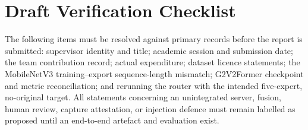 \documentclass[12pt,a4paper,oneside]{report}
\begin{document}




\tableofcontents
\listoffigures
\listoftables

\clearpage
{}








\clearpage



\appendix
\chapter{Draft Verification Checklist}
\label{app:checklist}
The following items must be resolved against primary records before the report is
submitted: supervisor identity and title; academic session and submission date;
the team contribution record; actual expenditure; dataset licence statements;
the MobileNetV3 training--export sequence-length mismatch; G2V2Former checkpoint
and metric reconciliation; and rerunning the router with the intended five-expert,
no-original target. All statements concerning an unintegrated server, fusion,
human review, capture attestation, or injection defence must remain labelled as
proposed until an end-to-end artefact and evaluation exist.
\end{document}
